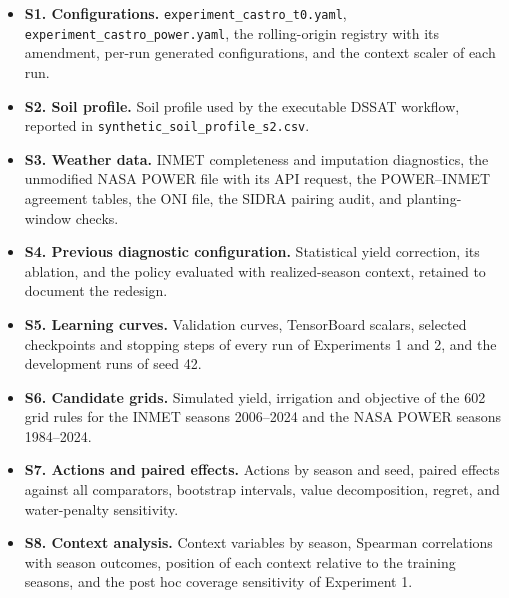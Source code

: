 \documentclass[times,final,authoryear]{elsarticle}
\begin{document}
\begin{itemize}
\item \textbf{S1. Configurations.} \texttt{experiment\_castro\_t0.yaml}, \texttt{experiment\_castro\_power.yaml}, the rolling-origin registry with its amendment, per-run generated configurations, and the context scaler of each run.
\item \textbf{S2. Soil profile.} Soil profile used by the executable DSSAT workflow, reported in \texttt{synthetic\_soil\_profile\_s2.csv}.
\item \textbf{S3. Weather data.} INMET completeness and imputation diagnostics, the unmodified NASA POWER file with its API request, the POWER--INMET agreement tables, the ONI file, the SIDRA pairing audit, and planting-window checks.
\item \textbf{S4. Previous diagnostic configuration.} Statistical yield correction, its ablation, and the policy evaluated with realized-season context, retained to document the redesign.
\item \textbf{S5. Learning curves.} Validation curves, TensorBoard scalars, selected checkpoints and stopping steps of every run of Experiments 1 and 2, and the development runs of seed 42.
\item \textbf{S6. Candidate grids.} Simulated yield, irrigation and objective of the 602 grid rules for the INMET seasons 2006--2024 and the NASA POWER seasons 1984--2024.
\item \textbf{S7. Actions and paired effects.} Actions by season and seed, paired effects against all comparators, bootstrap intervals, value decomposition, regret, and water-penalty sensitivity.
\item \textbf{S8. Context analysis.} Context variables by season, Spearman correlations with season outcomes, position of each context relative to the training seasons, and the post hoc coverage sensitivity of Experiment 1.
\end{itemize}






\end{document}
